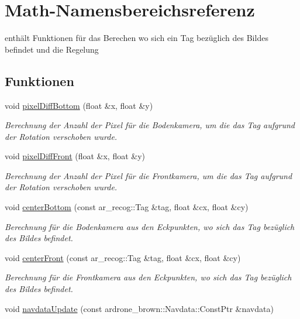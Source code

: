 \hypertarget{namespace_math}{
\section{Math-\/Namensbereichsreferenz}
\label{namespace_math}
}


enthält Funktionen für das Berechen wo sich ein Tag bezüglich des Bildes befindet und die Regelung  


\subsection*{Funktionen}
\begin{DoxyCompactItemize}
\item 
void \hyperlink{namespace_math_a25b9284eb485b732c952786b63343aaa}{pixelDiffBottom} (float \&x, float \&y)
\begin{DoxyCompactList}\small\item\em Berechnung der Anzahl der Pixel für die Bodenkamera, um die das Tag aufgrund der Rotation verschoben wurde. \end{DoxyCompactList}\item 
void \hyperlink{namespace_math_a3fbe7036db847d74ed5f2c21635d02d9}{pixelDiffFront} (float \&x, float \&y)
\begin{DoxyCompactList}\small\item\em Berechnung der Anzahl der Pixel für die Frontkamera, um die das Tag aufgrund der Rotation verschoben wurde. \end{DoxyCompactList}\item 
void \hyperlink{namespace_math_ab4c584467f0cc5d8af22a69482630866}{centerBottom} (const ar\_\-recog::Tag \&tag, float \&cx, float \&cy)
\begin{DoxyCompactList}\small\item\em Berechnung für die Bodenkamera aus den Eckpunkten, wo sich das Tag bezüglich des Bildes befindet. \end{DoxyCompactList}\item 
void \hyperlink{namespace_math_a43f025fac1ade5dbf88f7c393ca85644}{centerFront} (const ar\_\-recog::Tag \&tag, float \&cx, float \&cy)
\begin{DoxyCompactList}\small\item\em Berechnung für die Frontkamera aus den Eckpunkten, wo sich das Tag bezüglich des Bildes befindet. \end{DoxyCompactList}\item 
void \hyperlink{namespace_math_ad3b65f0aedda56076f681f2b987d0e5c}{navdataUpdate} (const ardrone\_\-brown::Navdata::ConstPtr \&navdata)

\end{DoxyCompactItemize}
